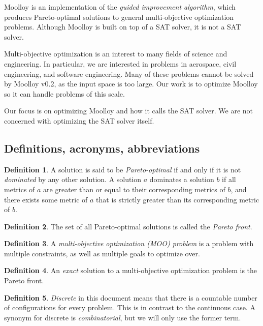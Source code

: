 \documentclass[11pt]{article}
\theoremstyle{definition}
\newtheorem{mydef}{Definition}
\begin{document}
Moolloy is an implementation of the \textit{guided improvement
algorithm}, which produces Pareto-optimal solutions to general
multi-objective optimization problems. Although Moolloy is built on top
of a SAT solver, it is not a SAT solver.

Multi-objective optimization is an interest to many fields of science
and engineering. In particular, we are interested in problems in
aerospace, civil engineering, and software engineering. Many of these
problems cannot be solved by Moolloy v0.2, as the input space is too
large. Our work is to optimize Moolloy so it can handle problems of
this scale.

Our focus is on optimizing Moolloy and how it calls the SAT solver. We
are not concerned with optimizing the SAT solver itself.

\subsection{Definitions, acronyms, abbreviations}

\begin{mydef}
A solution is said to be \textit{Pareto-optimal} if and only if it is
not \textit{dominated} by any other solution. A solution $a$ dominates
a solution $b$ if all metrics of $a$ are greater than or equal to their
corresponding metrics of $b$, and there exists some metric of $a$ that
is strictly greater than its corresponding metric of $b$.
\end{mydef}

\begin{mydef}
The set of all Pareto-optimal solutions is called the
\textit{Pareto front}.
\end{mydef}

\begin{mydef}
A \textit{multi-objective optimization (MOO) problem} is a problem with
multiple constraints, as well as multiple goals to optimize over.
\end{mydef}

\begin{mydef}
An \textit{exact} solution to a multi-objective optimization problem is
the Pareto front.
\end{mydef}

\begin{mydef}
\textit{Discrete} in this document means that there is a countable
number of configurations for every problem. This is in contrast to the
continuous case. A synonym for discrete is \textit{combinatorial}, but
we will only use the former term.  \end{mydef}
\end{document}
